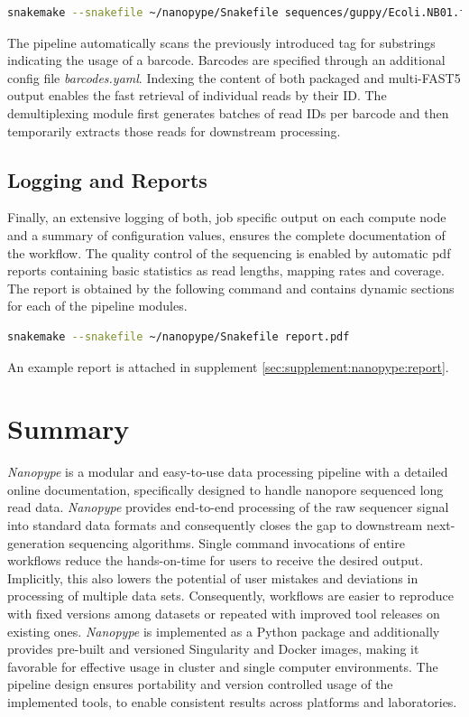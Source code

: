 \begin{lstlisting}[language=sh, caption=Nanopype demultiplexing]
snakemake --snakefile ~/nanopype/Snakefile sequences/guppy/Ecoli.NB01.fastq.gz
\end{lstlisting}

The pipeline automatically scans the previously introduced tag for substrings indicating the usage of a barcode. Barcodes are specified through an additional config file \textit{barcodes.yaml}.
Indexing the content of both packaged and multi-FAST5 output enables the fast retrieval of individual reads by their ID. The demultiplexing module first generates batches of read IDs per barcode and then temporarily extracts those reads for downstream processing.


\subsection{Logging and Reports}
\label{subsec:nanopype:logging}

Finally, an extensive logging of both, job specific output on each compute node and a summary of configuration values, ensures the complete documentation of the workflow. The quality control of the sequencing is enabled by automatic pdf reports containing basic statistics as read lengths, mapping rates and coverage. The report is obtained by the following command and contains dynamic sections for each of the pipeline modules.

\begin{lstlisting}[language=sh, caption=Nanopype report]
snakemake --snakefile ~/nanopype/Snakefile report.pdf
\end{lstlisting}

An example report is attached in supplement \ref{sec:supplement:nanopype:report}.




\section{Summary}
\label{sec:nanopype:summary}
\textit{Nanopype} is a modular and easy-to-use data processing pipeline with a detailed online documentation, specifically designed to handle nanopore sequenced long read data.
\textit{Nanopype} provides end-to-end processing of the raw sequencer signal into standard data formats and consequently closes the gap to downstream next-generation sequencing algorithms. Single command invocations of entire workflows reduce the hands-on-time for users to receive the desired output. 
Implicitly, this also lowers the potential of user mistakes and deviations in processing of multiple data sets. Consequently, workflows are easier to reproduce with fixed versions among datasets or repeated with improved tool releases on existing ones.
\textit{Nanopype} is implemented as a Python package and additionally provides pre-built and versioned Singularity and Docker images, making it favorable for effective usage in cluster and single computer environments. The pipeline design ensures portability and version controlled usage of the implemented tools, to enable consistent results across platforms and laboratories.


